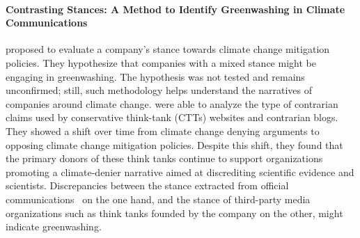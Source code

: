 \paragraph{Contrasting Stances: A Method to Identify Greenwashing in Climate Communications} \citet{morio2023an} proposed to evaluate a company's stance %
towards climate change mitigation policies. They hypothesize that companies with a mixed stance might be engaging in greenwashing. The hypothesis was not tested and remains unconfirmed; still, such methodology helps understand the narratives of companies around climate change. \citet{coanComputerassistedClassificationContrarian2021} were able to analyze the type of contrarian claims used by conservative think-tank (CTTs) websites and contrarian blogs. They showed a shift over time from climate change denying arguments to opposing climate change mitigation policies. Despite this shift, they found that the primary donors of these think tanks continue to support organizations promoting a climate-denier narrative aimed at discrediting scientific evidence and scientists. Discrepancies between the stance extracted from official communications~\cite{morio2023an} on the one hand, and the stance of third-party media organizations such as think tanks founded by the company \cite{coanComputerassistedClassificationContrarian2021} on the other, might indicate greenwashing.

 

% 

